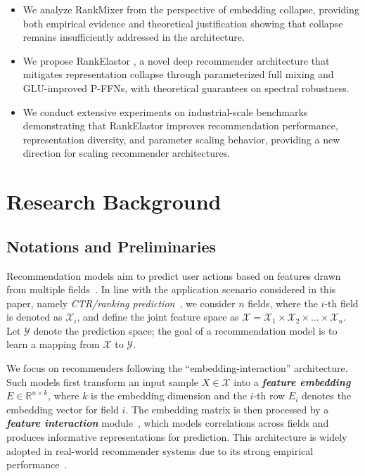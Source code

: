 \documentclass[sigconf,screen]{acmart}
\newcommand{\unimixer}{RankElastor }
\newcommand{\rankmixer}{RankMixer }
\begin{document}
\begin{itemize}[leftmargin=15pt,parsep=2pt,itemsep=2pt,topsep=2pt]
    \item We analyze \rankmixer from the perspective of embedding collapse, providing both empirical evidence and theoretical justification showing that collapse remains insufficiently addressed in the architecture.
    \item We propose \unimixer, a novel deep recommender architecture that mitigates representation collapse through parameterized full mixing and GLU-improved P-FFNs, with theoretical guarantees on spectral robustness.
    \item We conduct extensive experiments on industrial-scale benchmarks demonstrating that \unimixer improves recommendation performance, representation diversity, and parameter scaling behavior, providing a new direction for scaling recommender architectures.
\end{itemize}
\section{Research Background}
\label{sec:background}

\subsection{Notations and Preliminaries}\label{sec:background:prelim}

Recommendation models aim to predict user actions based on features drawn from multiple fields~\cite{multi-field-categorical-data}. 
In line with the application scenario considered in this paper, namely \textit{CTR/ranking prediction}~\cite{ctr-prediction}, we consider \(n\) fields, where the \(i\)-th field is denoted as \(\mathcal{X}_i\), and define the joint feature space as \(\mathcal{X}=\mathcal{X}_1\times\mathcal{X}_2\times\dots\times\mathcal{X}_n\). 
Let \(\mathcal{Y}\) denote the prediction space; the goal of a recommendation model is to learn a mapping from \(\mathcal{X}\) to \(\mathcal{Y}\).

We focus on recommenders following the ``embedding-interaction'' architecture. 
Such models first transform an input sample \(X \in \mathcal{X}\) into a \textit{\textbf{feature embedding}} \(E \in \mathbb{R}^{n \times k}\), where \(k\) is the embedding dimension and the \(i\)-th row \(E_i\) denotes the embedding vector for field \(i\). 
The embedding matrix is then processed by a \textit{\textbf{feature interaction}} module~\cite{feature-interaction-1,feature-interaction-2}, which models correlations across fields and produces informative representations for prediction. 
This architecture is widely adopted in real-world recommender systems due to its strong empirical performance~\cite{dcnv2+crossnet,xdeepfm+cin,autoint,fm}.
\end{document}
